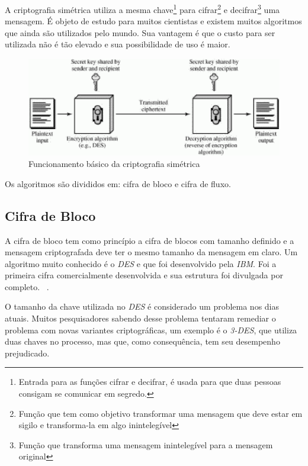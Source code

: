 A criptografia simétrica utiliza a mesma chave\footnote{Entrada para as funções cifrar e decifrar, é usada para que duas pessoas consigam se comunicar em segredo.} para cifrar\footnote{Função que tem como objetivo transformar uma mensagem que deve estar em sigilo e transforma-la em algo inintelegível} e decifrar\footnote{Função que transforma uma mensagem inintelegível para a mensagem original} uma mensagem. É objeto de estudo para muitos cientistas e existem muitos algoritmos que ainda são utilizados pelo mundo. Sua vantagem é que o custo para ser utilizada não é tão elevado e sua possibilidade de uso é maior. 

\begin{figure}[h]
\centering
\includegraphics[scale=0.7]
{figuras/SymmetricCipher.eps}
\caption[Funcionamento básico da criptografia simétrica] {Funcionamento básico da criptografia simétrica\protect\footnotemark}
\end{figure}

Os algoritmos são divididos em: cifra de bloco e cifra de fluxo.

\subsection{Cifra de Bloco}
\label{block-cipher}

A cifra de bloco tem como princípio a cifra de blocos com tamanho definido e a mensagem criptografada deve ter o mesmo tamanho da mensagem em claro. Um algoritmo muito conhecido é o \textit{DES} e que foi desenvolvido pela \textit{IBM}. Foi a primeira cifra comercialmente desenvolvida e sua estrutura foi divulgada por completo. ~\cite{alex-biryukov}. 

O tamanho da chave utilizada no \textit{DES} é considerado um problema nos dias atuais. Muitos pesquisadores sabendo desse problema tentaram remediar o problema com novas variantes criptográficas, um exemplo é o \textit{3-DES}, que utiliza duas chaves no processo, mas que, como consequência, tem seu desempenho prejudicado. 

